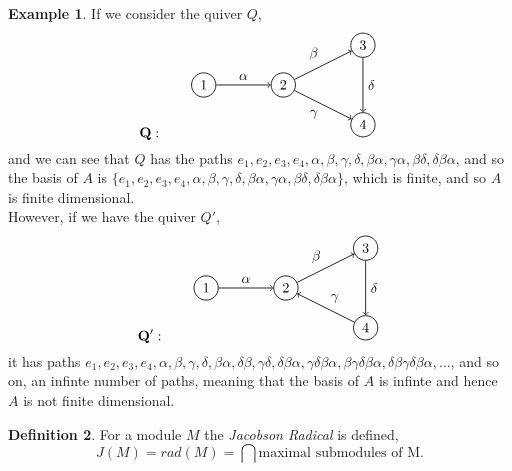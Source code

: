 \documentclass[11.5pt, twoside, a4paper, titlepage]{report}
\theoremstyle{definition}
\newtheorem{mydef}{Definition}[section]
\newtheorem{eg}[mydef]{Example}
\theoremstyle{plain}
\begin{document}
\begin{eg}
If we consider the quiver $Q$, 
\begin{equation*}
\mathbf{Q}: \qquad
\begin{tikzpicture}[->,-latex, auto, every path/.style={->, semithick}, main node/.style={draw, circle}]
\node	[main node]		(1) at (0,0)		{1};
\node [main node]		(2) at (2,0)		{2};
\node [main node]		(3) at (4,1)		{3};
\node [main node]		(4) at (4,-1)		{4};

\draw (1) edge node [auto] {$\alpha$} (2);
\draw (2) edge node [auto] {$\beta$} (3);
\draw (2) edge node [auto, swap] {$\gamma$} (4);
\draw (3) edge node [auto] {$\delta$} (4);
\end{tikzpicture}
\end{equation*}
and we can see that $Q$ has the paths $e_1, e_2, e_3, e_4, \alpha, \beta, \gamma, \delta, \beta\alpha, \gamma\alpha, \beta\delta, \delta\beta\alpha$, and so the basis of $A$ is $\{e_1, e_2, e_3, e_4, \alpha, \beta, \gamma, \delta, \beta\alpha, \gamma\alpha, \beta\delta, \delta\beta\alpha\}$, which is finite, and so $A$ is finite dimensional. \\
However, if we have the quiver $Q'$, 
\begin{equation*}
\mathbf{Q'}: \qquad
\begin{tikzpicture}[->,-latex, auto, every path/.style={->, semithick}, main node/.style={draw, circle}]
\node	[main node]		(1) at (0,0)		{1};
\node [main node]		(2) at (2,0)		{2};
\node [main node]		(3) at (4,1)		{3};
\node [main node]		(4) at (4,-1)		{4};

\draw (1) edge node [auto] {$\alpha$} (2);
\draw (2) edge node [auto] {$\beta$} (3);
\draw (4) edge node [auto, swap] {$\gamma$} (2);
\draw (3) edge node [auto] {$\delta$} (4);
\end{tikzpicture}
\end{equation*}
it has paths $e_1, e_2, e_3, e_4, \alpha, \beta, \gamma, \delta, \beta\alpha,\delta\beta, \gamma\delta, \delta\beta\alpha, \gamma\delta\beta\alpha, \beta\gamma\delta\beta\alpha, \delta\beta\gamma\delta\beta\alpha, \dots$, and so on, an infinte number of paths, meaning that the basis of $A$ is infinte and hence $A$ is not finite dimensional.
\end{eg}

\begin{mydef}
For a module $M$  the \emph{Jacobson Radical} is defined, 
\begin{equation*}
J(M)=rad(M)=\bigcap \text{maximal submodules of M}.
\end{equation*}
\end{mydef}
\end{document}
